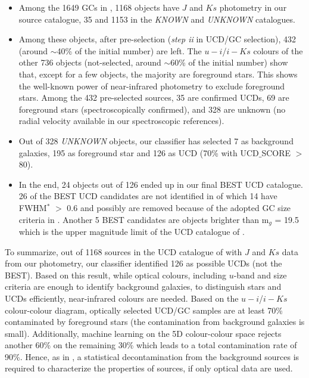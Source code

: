 \documentclass[fleqn,usenatbib]{mnras}
\begin{document}
\begin{itemize}
\item Among the 1649 GCs in \citet{Cantiello2020}, 1168 objects have $J$ and $Ks$ photometry in our source catalogue, 35 and 1153 in the \textit{KNOWN} and \textit{UNKNOWN} catalogues. \\

\item Among these objects, after pre-selection (\textit{step ii} in UCD/GC selection), 432 (around $\sim$40\% of the initial number) are left. The $u-i$/$i-Ks$ colours of the other 736 objects (not-selected, around $\sim$60\% of the initial number) show that, except for a few objects, the majority are foreground stars. This shows the well-known power of near-infrared photometry to exclude foreground stars. Among the 432 pre-selected sources, 35 are confirmed UCDs, 69 are foreground stars (spectroscopically confirmed), and 328 are unknown (no radial velocity available in our spectroscopic references). \\

\item Out of 328 \textit{UNKNOWN} objects, our classifier has selected 7 as background galaxies, 195 as foreground star and 126 as UCD (70\% with UCD$\_$SCORE $>$ 80). \\

\item In the end, 24 objects out of 126 ended up in our final BEST UCD catalogue. 26 of the BEST UCD candidates are not identified in \citet{Cantiello2020} of which 14 have FWHM$^*$ $>$ 0.6 and possibly are removed because of the adopted GC size criteria in \citet{Cantiello2020}. Another 5 BEST candidates are objects brighter than m$_g$ = 19.5 which is the upper magnitude limit of the UCD catalogue of \citet{Cantiello2020}. 
\end{itemize}

To summarize, out of 1168 sources in the UCD catalogue of \citet{Cantiello2020} with $J$ and $Ks$ data from our photometry, our classifier identified 126 as possible UCDs (not the BEST). Based on this result, while optical colours, including $u$-band and size criteria are enough to identify background galaxies, to distinguish stars and UCDs efficiently, near-infrared colours are needed. Based on the $u-i$/$i-Ks$ colour-colour diagram, optically selected UCD/GC samples are at least 70\% contaminated by foreground stars (the contamination from background galaxies is small). Additionally, machine learning on the 5D colour-colour space rejects another 60\% on the remaining 30\% which leads to a total contamination rate of 90\%. Hence, as in \citet{Cantiello2020}, a statistical decontamination from the background sources is required to characterize the properties of sources, if only optical data are used.
\end{document}
